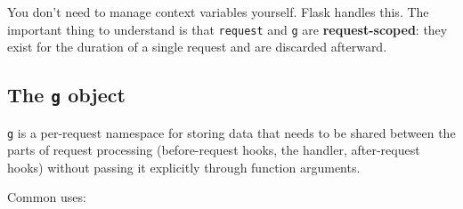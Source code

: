 \noindent{}You don't need to manage context variables yourself. Flask handles this. The important thing to understand is that \texttt{request} and \texttt{g} are \textbf{request-scoped}: they exist for the duration of a single request and are discarded afterward.

\subsection*{\texorpdfstring{The \texttt{g} object}{The g object}}\label{33-logic-execution:the-g-object}

\texttt{g} is a per-request namespace for storing data that needs to be shared between the parts of request processing (before-request hooks, the handler, after-request hooks) without passing it explicitly through function arguments.

Common uses:

\begin{codebox}

\begin{Shaded}
\begin{Highlighting}[]
\OperatorTok{=}

\OperatorTok{=}\OperatorTok{{-}}\OperatorTok{*} 

       
\OperatorTok{=}

\OperatorTok{=}\NormalTok{, }\NormalTok{)}
      \NormalTok{:}
\end{Highlighting}
\end{Shaded}

\end{codebox}

